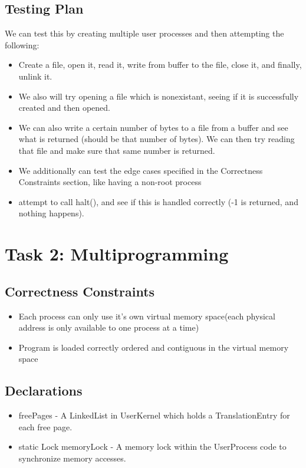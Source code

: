 \documentclass{article}
\begin{document}
\subsection*{Testing Plan}
We can test this by creating multiple user processes and then attempting the following:
\begin{itemize}
\item Create a file, open it, read it, write from buffer to the file, close it, and finally, unlink it.
\item We also will try opening a file which is nonexistant, seeing if it is successfully created and then opened.
\item We can also write a certain number of bytes to a file from a buffer and see what is returned (should be that number of bytes). We can then try reading that file and make sure that same number is returned.\newline
\item We additionally can test the edge cases specified in the Correctness Constraints section, like having a non-root process
\item attempt to call halt(), and see if this is handled correctly (-1 is returned, and nothing happens).
\end{itemize}

\section*{Task 2: Multiprogramming}

\subsection*{Correctness Constraints}
\begin{itemize}
\item Each process can only use it's own virtual memory space(each physical address is only available to one process at a time)
\item Program is loaded correctly ordered and contiguous in the virtual memory space
\end{itemize}

\subsection*{Declarations}
\begin{itemize}
\item freePages - A LinkedList in UserKernel which holds a TranslationEntry for each free page.
\item static Lock memoryLock - A memory lock within the UserProcess code to synchronize memory accesses.
\end{itemize}
\end{document}

